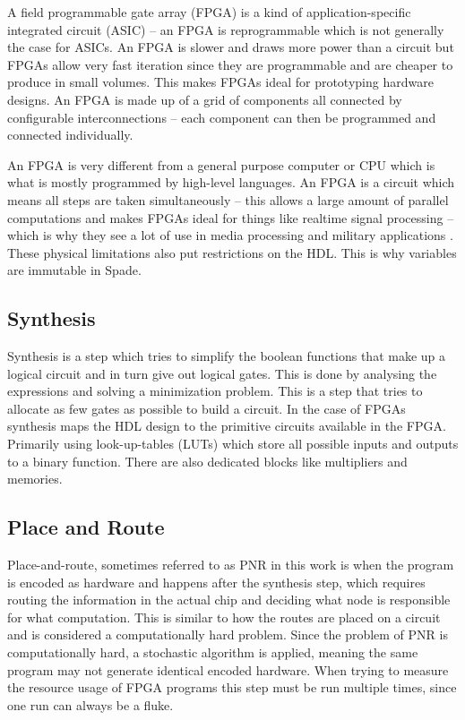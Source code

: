 A field programmable gate array (FPGA) is a kind of application-specific integrated circuit (ASIC) -- an FPGA is reprogrammable which is not generally the case for ASICs. An FPGA is slower and draws more power than a  circuit but FPGAs allow very fast iteration since they are programmable and are cheaper to produce in small volumes. This makes FPGAs ideal for prototyping hardware designs. An FPGA is made up of a grid of components all connected by configurable interconnections -- each component can then be programmed and connected individually. \cite{src:FPGA}

An FPGA is very different from a general purpose computer or CPU which is what is mostly programmed by high-level languages. An FPGA is a circuit which means all steps are taken simultaneously -- this allows a large amount of parallel computations and makes FPGAs ideal for things like realtime signal processing -- which is why they see a lot of use in media processing and military applications \cite{src:FPGAApplications}. These physical limitations also put restrictions on the HDL. This is why variables are immutable in Spade.

\subsection{Synthesis}
Synthesis is a step which tries to simplify the boolean functions that make up a logical circuit and in turn give out logical gates. This is done by analysing the expressions and solving a minimization problem. This is a step that tries to allocate as few gates as possible to build a circuit. In the case of FPGAs synthesis maps the HDL design to the primitive circuits available in the FPGA. Primarily using look-up-tables (LUTs) which store all possible inputs and outputs to a binary function. There are also dedicated blocks like multipliers and memories.

\subsection{Place and Route}
Place-and-route, sometimes referred to as PNR in this work is when the program is encoded as hardware and happens after the synthesis step, which requires routing the information in the actual chip and deciding what node is responsible for what computation. This is similar to how the routes are placed on a  circuit and is considered a computationally hard problem. Since the problem of PNR is computationally hard, a stochastic algorithm is applied, meaning the same program may not generate identical encoded hardware. When trying to measure the resource usage of FPGA programs this step must be run multiple times, since one run can always be a fluke.
